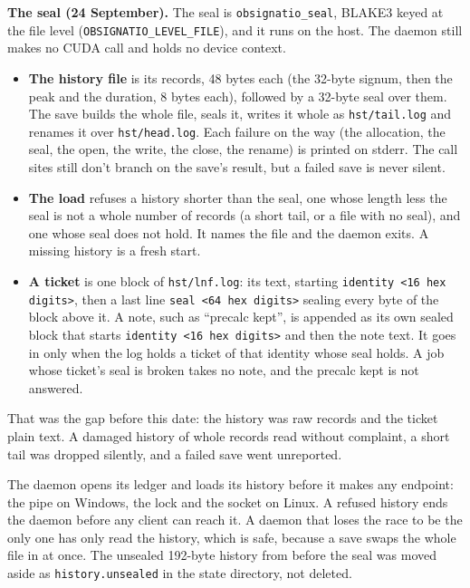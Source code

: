 \textbf{The seal (24 September).} The seal is \texttt{obsignatio\_\allowbreak{}seal}, BLAKE3 keyed at the file level (\texttt{OBSIGNATIO\_\allowbreak{}LEVEL\_\allowbreak{}FILE}), and it runs on the host. The daemon still makes no CUDA call and holds no device context.

\begin{itemize}
\item \textbf{The history file} is its records, 48 bytes each (the 32-byte signum, then the peak and the duration, 8 bytes each), followed by a 32-byte seal over them. The save builds the whole file, seals it, writes it whole as \texttt{hst/\allowbreak{}tail.\allowbreak{}log} and renames it over \texttt{hst/\allowbreak{}head.\allowbreak{}log}. Each failure on the way (the allocation, the seal, the open, the write, the close, the rename) is printed on stderr. The call sites still don't branch on the save's result, but a failed save is never silent.
\item \textbf{The load} refuses a history shorter than the seal, one whose length less the seal is not a whole number of records (a short tail, or a file with no seal), and one whose seal does not hold. It names the file and the daemon exits. A missing history is a fresh start.
\item \textbf{A ticket} is one block of \texttt{hst/\allowbreak{}lnf.\allowbreak{}log}: its text, starting \texttt{identity <16 hex digits>}, then a last line \texttt{seal <64 hex digits>} sealing every byte of the block above it. A note, such as “precalc kept”, is appended as its own sealed block that starts \texttt{identity <16 hex digits>} and then the note text. It goes in only when the log holds a ticket of that identity whose seal holds. A job whose ticket's seal is broken takes no note, and the precalc kept is not answered.
\end{itemize}

That was the gap before this date: the history was raw records and the ticket plain text. A damaged history of whole records read without complaint, a short tail was dropped silently, and a failed save went unreported.

The daemon opens its ledger and loads its history before it makes any endpoint: the pipe on Windows, the lock and the socket on Linux. A refused history ends the daemon before any client can reach it. A daemon that loses the race to be the only one has only read the history, which is safe, because a save swaps the whole file in at once. The unsealed 192-byte history from before the seal was moved aside as \texttt{history.\allowbreak{}unsealed} in the state directory, not deleted.

